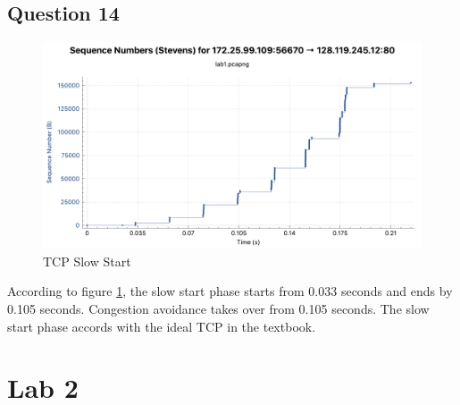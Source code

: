 \documentclass[titlepage, paper=a4, fontsize=11pt]{scrartcl} %
\numberwithin{equation}{section} %
\numberwithin{figure}{section} %
\numberwithin{table}{section} %
\begin{document}
\subsection*{Question 14}
\begin{figure}[!ht]
    \centering
    \includegraphics[width=\textwidth]{images/lab1-q14.pdf}
    \caption{TCP Slow Start}
    \label{fig:tcp-ss2}
\end{figure}
According to figure \ref{fig:tcp-ss2}, the slow start phase starts from 0.033 seconds and ends by 0.105 seconds. Congestion avoidance takes over from 0.105 seconds. The slow start phase accords with the ideal TCP in the textbook. \\




\section*{\textbf{Lab 2}}
\end{document}
